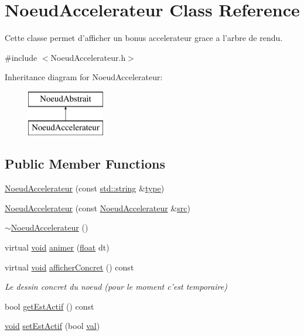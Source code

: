 \hypertarget{class_noeud_accelerateur}{\section{Noeud\-Accelerateur Class Reference}
\label{class_noeud_accelerateur}
}


Cette classe permet d'afficher un bonus accelerateur grace a l'arbre de rendu.  




{\ttfamily \#include $<$Noeud\-Accelerateur.\-h$>$}

Inheritance diagram for Noeud\-Accelerateur\-:\begin{figure}[H]
\begin{center}
\leavevmode
\includegraphics[height=2.000000cm]{class_noeud_accelerateur}
\end{center}
\end{figure}
\subsection*{Public Member Functions}
\begin{DoxyCompactItemize}
\item 
\hyperlink{class_noeud_accelerateur_a4b37b22cfb43ba30430642aeb4ec8a62}{Noeud\-Accelerateur} (const \hyperlink{glew_8h_ae84541b4f3d8e1ea24ec0f466a8c568b}{std\-::string} \&\hyperlink{fmod_8h_a5338b9cb3874378d7e5adfbe80a8a381}{type})
\item 
\hyperlink{class_noeud_accelerateur_a9f9237bb8d441b733f1a522c7d918a00}{Noeud\-Accelerateur} (const \hyperlink{class_noeud_accelerateur}{Noeud\-Accelerateur} \&\hyperlink{glew_8h_a72e0fdf0f845ded60b1fada9e9195cd7}{src})
\item 
\hyperlink{class_noeud_accelerateur_abc2330c49066f24a13c14aba2ed88108}{$\sim$\-Noeud\-Accelerateur} ()
\item 
virtual \hyperlink{wglew_8h_aeea6e3dfae3acf232096f57d2d57f084}{void} \hyperlink{class_noeud_accelerateur_aaad5010633c75c21af1a326bfea55777}{animer} (\hyperlink{fmod_8h_aeb841aa4b4b5f444b5d739d865b420af}{float} dt)
\item 
virtual \hyperlink{wglew_8h_aeea6e3dfae3acf232096f57d2d57f084}{void} \hyperlink{class_noeud_accelerateur_a9f4a4900957b211e13bd31b32688a600}{afficher\-Concret} () const 
\begin{DoxyCompactList}\small\item\em Le dessin concret du noeud (pour le moment c'est temporaire) \end{DoxyCompactList}\item 
bool \hyperlink{class_noeud_accelerateur_aef7e490cb71247056a57d2b3d2e9e060}{get\-Est\-Actif} () const 
\item 
\hyperlink{wglew_8h_aeea6e3dfae3acf232096f57d2d57f084}{void} \hyperlink{class_noeud_accelerateur_a36f42eb2a4bbc261cbdf25982fb9e633}{set\-Est\-Actif} (bool \hyperlink{glew_8h_a26942fd2ed566ef553eae82d2c109c8f}{val})
\end{DoxyCompactItemize}
